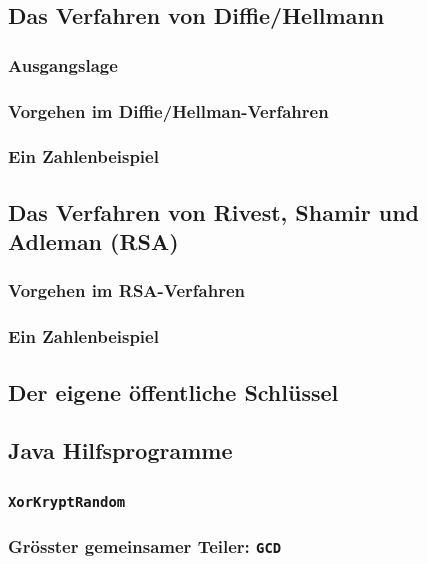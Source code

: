 \subsection{Das Verfahren von Diffie/Hellmann}
\subsubsection*{Ausgangslage}

\subsubsection*{Vorgehen im Diffie/Hellman-Verfahren}
\label{subsubsec:diffie-hellmann}

\subsubsection*{Ein Zahlenbeispiel}

\subsection{Das Verfahren von Rivest, Shamir und Adleman (RSA)}
\label{subsec:rsa}

\subsubsection*{Vorgehen im RSA-Verfahren}
\subsubsection*{Ein Zahlenbeispiel}

\subsection{Der eigene öffentliche Schlüssel}

\subsection{Java Hilfsprogramme}
\label{subsec:java-programme}

\subsubsection*{\texttt{XorKryptRandom}}
\subsubsection*{Grösster gemeinsamer Teiler: \texttt{GCD}}
